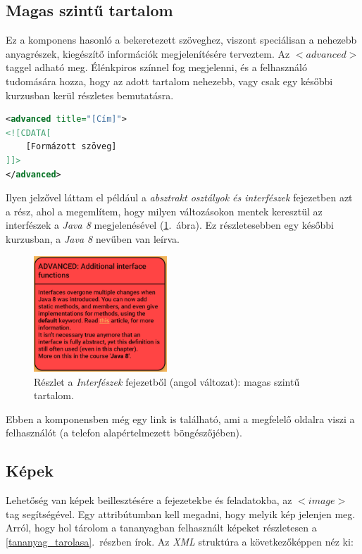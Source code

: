 \documentclass[12pt,a4paper]{article}
\newcommand{\xml}{\textit{XML}\xspace}
\begin{document}
	\subsection{Magas szintű tartalom}
	
	Ez a komponens hasonló a bekeretezett szöveghez, viszont speciálisan a nehezebb anyagrészek, kiegészítő információk megjelenítésére terveztem. Az $<advanced>$ taggel adható meg. Élénkpiros színnel fog megjelenni, és a felhasználó tudomására hozza, hogy az adott tartalom nehezebb, vagy csak egy későbbi kurzusban kerül részletes bemutatásra.
	
	\bigskip
	\begin{lstlisting}[language=XML]
<advanced title="[Cím]">
<![CDATA[
	[Formázott szöveg]
]]>
</advanced>	
	\end{lstlisting}
	\bigskip
	
	Ilyen jelzővel láttam el például a \textit{absztrakt osztályok és interfészek} fejezetben azt a rész, ahol a megemlítem, hogy milyen változásokon mentek keresztül az interfészek a \textit{Java 8} megjelenésével (\ref{advanced_component_figure}.\ ábra). Ez részletesebben egy későbbi kurzusban, a \textit{Java 8} nevűben van leírva.
	
	\begin{figure}[h!]
		\centering
		\includegraphics[width=5cm]{advanced_component}
		\caption{Részlet a \textit{Interfészek} fejezetből (angol változat): magas szintű tartalom.}
		\label{advanced_component_figure}
	\end{figure}
	
	Ebben a komponensben még egy link is található, ami a megfelelő oldalra viszi a felhasználót (a telefon alapértelmezett böngészőjében).
	
	\subsection{Képek}
	
	Lehetőség van képek beillesztésére a fejezetekbe és feladatokba, az $<image>$ tag segítségével. Egy attribútumban kell megadni, hogy melyik kép jelenjen meg. Arról, hogy hol tárolom a tananyagban felhasznált képeket részletesen a \ref{tananyag_tarolasa}.\ részben írok. Az \xml struktúra a következőképpen néz ki:
	
\end{document}

